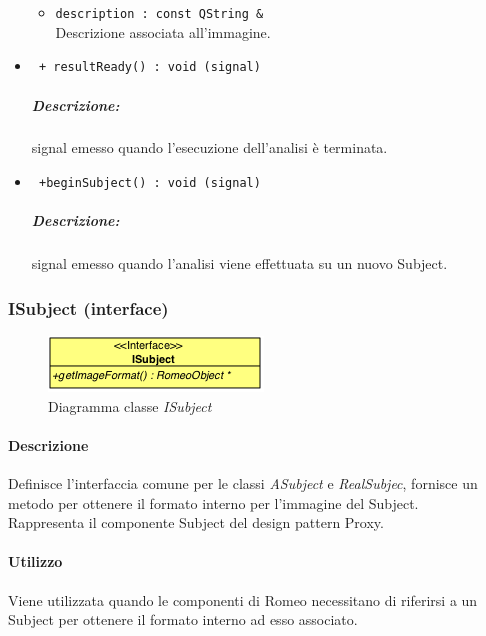 \begin{itemize}
\begin{itemize}
			\item \color{RoyalPurple}\verb!description : const QString &!\\
			\color{black}Descrizione associata all'immagine.
		\end{itemize}
		
	\item \color{blue}\verb! + resultReady() : void (signal)!\\
	\color{black}\subparagraph{Descrizione:} signal\g{} emesso quando l'esecuzione dell'analisi è terminata.
	
	\item \color{blue}\verb! +beginSubject() : void (signal)!\\
	\color{black}\subparagraph{Descrizione:} signal\g{} emesso quando l'analisi viene effettuata su un nuovo Subject\g{}.

	\end{itemize}
 


\pagebreak
\color{black}
\subsubsection{ISubject (interface)}
\label{iSubject}
\begin{figure}[!h]
\centering
			\centering
			 \includegraphics[scale=1.00]{./Content/Immagini/modelCore/ISubject.png}
			 \caption{Diagramma classe \textsl{ISubject}}
			\label{iSubject_img}
\end{figure}

\paragraph{Descrizione \\}
	Definisce l’interfaccia comune per le classi \textsl{ASubject} e \textsl{RealSubjec}, fornisce un metodo per ottenere il formato interno per l’immagine del Subject\g{}.
	\\Rappresenta il componente Subject del design pattern\g{} Proxy.

\paragraph{Utilizzo \\}
Viene utilizzata quando le componenti di Romeo\g{} necessitano di riferirsi a un Subject\g{} per ottenere il formato interno ad esso associato. 

